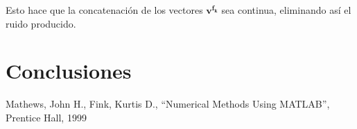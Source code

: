 \documentclass[journal, monochrome]{IEEEtran}
\begin{document}
Esto hace que la concatenación de los vectores $\mathbf{v^{f_k}}$ sea continua, eliminando así el ruido producido.



\vspace{1cm}
\section{Conclusiones}
\label{section:conclusions}
\vspace{0.5cm}




\vspace{1cm}
\begin{thebibliography}{1}
	Mathews, John H.,
	Fink, Kurtis D.,
	``Numerical Methods Using MATLAB'',
	Prentice Hall,
	1999
	
\end{thebibliography}





\begin{figure}
	
\end{figure}
\begin{figure}
	
\end{figure}
\begin{figure}
	
\end{figure}
\begin{figure}
	
\end{figure}


\begin{figure}
	
\end{figure}
\begin{figure}
	
\end{figure}
\begin{figure}
	
\end{figure}
\end{document}
